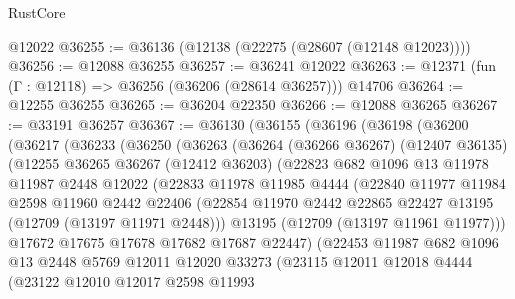 \begin{lexlean}{RustCore}
\begin{coremodule}
    @12022
@36255 := @36136 (@12138 (@22275 (@28607 (@12148 @12023))))
@36256 := @12088 @36255
@36257 := @36241 @12022
@36263 := @12371 (fun (Γ : @12118) => @36256 (@36206 (@28614 @36257))) @14706
@36264 := @12255 @36255
@36265 := @36204 @22350
@36266 := @12088 @36265
@36267 := @33191 @36257
@36367 := @36130
    (@36155
      (@36196
        (@36198
          (@36200
            (@36217
              (@36233
                (@36250
                  (@36263
                    (@36264
                      (@36266 @36267)
                      (@12407 @36135)
                      (@12255
                        @36265
                        @36267
                        (@12412 @36203)
                        (@22823
                          @682
                          @1096
                          @13
                          @11978
                          @11987
                          @2448
                          @12022
                          (@22833
                            @11978
                            @11985
                            @4444
                            (@22840
                              @11977
                              @11984
                              @2598
                              @11960
                              @2442
                              @22406
                              (@22854
                                @11970
                                @2442
                                @22865
                                @22427
                                @13195
                                (@12709 (@13197 @11971 @2448)))
                              @13195
                              (@12709 (@13197 @11961 @11977)))
                            @17672
                            @17675
                            @17678
                            @17682
                            @17687
                            @22447)
                          (@22453
                            @11987
                            @682
                            @1096
                            @13
                            @2448
                            @5769
                            @12011
                            @12020
                            @33273
                            (@23115
                              @12011
                              @12018
                              @4444
                              (@23122
                                @12010
                                @12017
                                @2598
                                @11993

\end{coremodule}
\end{lexlean}
